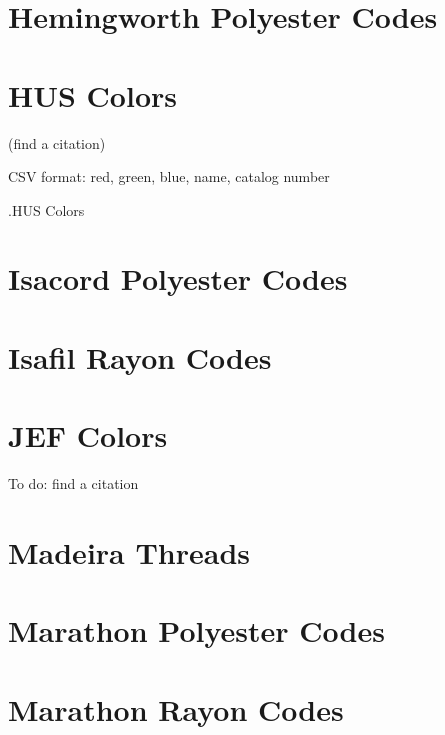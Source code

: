 \documentclass[a4paper]{report}
\begin{document}
\section{Hemingworth Polyester Codes}

%

\section{HUS Colors}

(find a citation)

CSV format: red, green, blue, name, catalog number

.HUS Colors

%

\section{Isacord Polyester Codes}

%

\section{Isafil Rayon Codes}

%

\section{JEF Colors}

To do: find a citation

%

\section{Madeira Threads}

%

%

\section{Marathon Polyester Codes}

%

\section{Marathon Rayon Codes}
\end{document}

